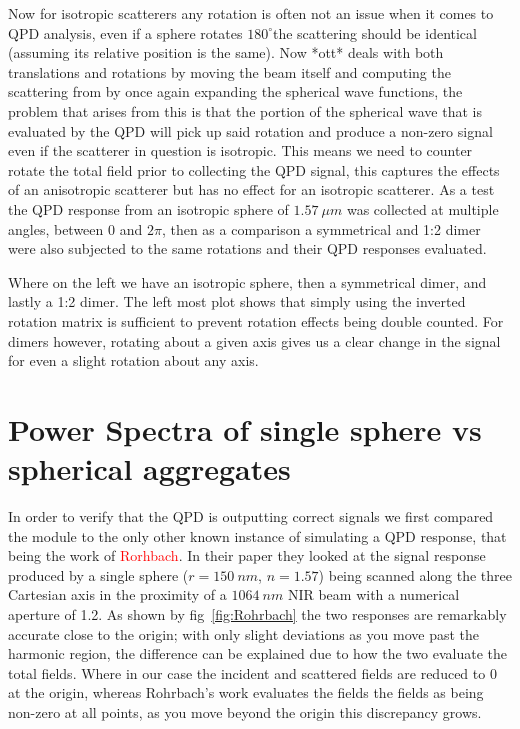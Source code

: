 Now for isotropic scatterers any rotation is often not an issue when it comes to QPD analysis, even if a sphere rotates $180^{\circ}$the scattering should be identical (assuming its relative position is the same). Now *ott* deals with both translations and rotations by moving the beam itself and computing the scattering from by once again expanding the spherical wave functions, the problem that arises from this is that the portion of the spherical wave that is evaluated by the QPD will pick up said rotation and produce a non-zero signal even if the scatterer in question is isotropic. This means we need to counter rotate the total field prior to collecting the QPD signal, this captures the effects of an anisotropic scatterer but has no effect for an isotropic scatterer. As a test the QPD response from an isotropic sphere of $1.57 \ \mu m$ was collected at multiple angles, between 0 and $2\pi$, then as a comparison a symmetrical and 1:2 dimer were also subjected to the same rotations and their QPD responses evaluated. 

Where on the left we have an isotropic sphere, then a symmetrical dimer, and lastly a 1:2 dimer. The left most plot shows that simply using the inverted rotation matrix is sufficient to prevent rotation effects being double counted.
For dimers however, rotating about a given axis gives us a clear change in the signal for even a slight rotation about any axis. 

\section{Power Spectra of single sphere vs spherical aggregates}
In order to verify that the QPD is outputting correct signals we first compared the module to the only other known instance of simulating a QPD response, that being the work of \textcolor{red}{Rorhbach}. In their paper they looked at the signal response produced by a single sphere ($r = 150\ nm$, $n = 1.57$) being scanned along the three Cartesian axis in the proximity of a $1064\ nm$ NIR beam with a numerical aperture of 1.2. As shown by fig~\ref{fig:Rohrbach} the two responses are remarkably accurate close to the origin; with only slight deviations as you move past the harmonic region, the difference can be explained due to how the two evaluate the total fields. Where in our case the incident and scattered fields are reduced to 0 at the origin, whereas Rohrbach's work evaluates the fields the fields as being non-zero at all points, as you move beyond the origin this discrepancy grows. 

